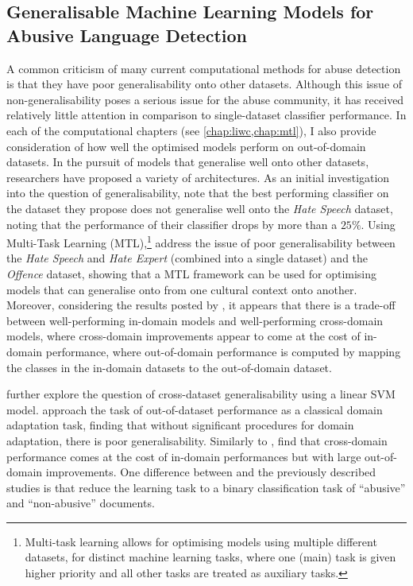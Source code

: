 \subsection{Generalisable Machine Learning Models for Abusive Language Detection}
A common criticism of many current computational methods for abuse detection is that they have poor generalisability onto other datasets. Although this issue of non-generalisability poses a serious issue for the abuse community, it has received relatively little attention \citep{Waseem:2016,Waseem:2018,Karan:2018,Wiegand:2019,Swamy:2019,Fortuna:2021} in comparison to single-dataset classifier performance. In each of the computational chapters (see \cref{chap:liwc,chap:mtl}), I also provide consideration of how well the optimised models perform on out-of-domain datasets.
In the pursuit of models that generalise well onto other datasets, researchers have proposed a variety of architectures. As an initial investigation into the question of generalisability, \citet{Waseem:2016} note that the best performing classifier on the dataset they propose does not generalise well onto the \textit{Hate Speech} dataset, noting that the performance of their classifier drops by more than a $25\%$.
Using Multi-Task Learning (MTL),\footnote{Multi-task learning allows for optimising models using multiple different datasets, for distinct machine learning tasks, where one (main) task is given higher priority and all other tasks are treated as auxiliary tasks.} \citet{Waseem:2018} address the issue of poor generalisability between the \textit{Hate Speech} and \textit{Hate Expert} (combined into a single dataset) and the \textit{Offence} dataset, showing that a MTL framework can be used for optimising models that can generalise onto from one cultural context onto another. Moreover, considering the results posted by \citet{Waseem:2018}, it appears that there is a trade-off between well-performing in-domain models and well-performing cross-domain models, where cross-domain improvements appear to come at the cost of in-domain performance, where out-of-domain performance is computed by mapping the classes in the in-domain datasets to the out-of-domain dataset.

\citet{Karan:2018} further explore the question of cross-dataset generalisability using a linear SVM model. \citet{Karan:2018} approach the task of out-of-dataset performance as a classical domain adaptation task, finding that without significant procedures for domain adaptation, there is poor generalisability. Similarly to \citet{Waseem:2018}, \citet{Karan:2018} find that cross-domain performance comes at the cost of in-domain performances but with large out-of-domain improvements. One difference between \citet{Karan:2018} and the previously described studies is that \citet{Karan:2018} reduce the learning task to a binary classification task of ``abusive'' and ``non-abusive'' documents.

